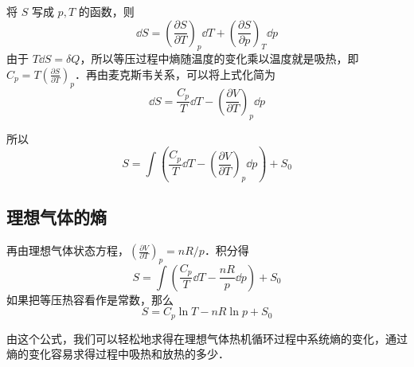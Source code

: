 

将 $S$ 写成 $p,T$ 的函数，则
\begin{equation}
\dd S=\left(\frac{\partial S}{\partial T}\right)_p \dd T+\left(\frac{\partial S}{\partial p}\right)_T \dd p
\end{equation}
由于 $T\dd S=\delta Q$，所以等压过程中熵随温度的变化乘以温度就是吸热，即 $C_p=T\left(\frac{\partial S}{\partial T}\right)_p$．再由麦克斯韦关系，可以将上式化简为
\begin{equation}
\dd S=\frac{C_p}{T}\dd T-\left(\frac{\partial V}{\partial T}\right)_p\dd p
\end{equation}

所以
\begin{equation}\label{MacroS_eq1}
S=\int \left(\frac{C_p}{T}\dd T-\left(\frac{\partial V}{\partial T}\right)_p\dd p\right)+S_0
\end{equation}


\subsection{理想气体的熵}
再由理想气体状态方程，$\left(\frac{\partial V}{\partial T}\right)_p=nR/p$．积分得
\begin{equation}\label{MacroS_eq2}
S=\int \left(\frac{C_p}{T}\dd T-\frac{nR}{p}\dd p\right)+S_0
\end{equation}
如果把等压热容看作是常数，那么
\begin{equation}
S=C_p\ln T-nR\ln p+S_0
\end{equation}

由这个公式，我们可以轻松地求得在理想气体热机循环过程中系统熵的变化，通过熵的变化容易求得过程中吸热和放热的多少．